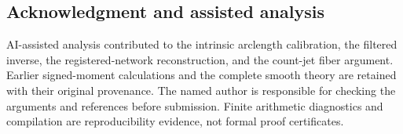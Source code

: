 \documentclass[11pt]{amsart}
\theoremstyle{definition}\newtheorem{definition}[theorem]{Definition}
\theoremstyle{remark}\newtheorem{remark}[theorem]{Remark}
\numberwithin{equation}{section}
\begin{document}
\subsection*{Acknowledgment and assisted analysis}
AI-assisted analysis contributed to the intrinsic arclength calibration,
the filtered inverse, the registered-network reconstruction, and the
count-jet fiber argument. Earlier signed-moment calculations and the
complete smooth theory are retained with their original provenance.
The named author is responsible for checking the arguments and references
before submission. Finite arithmetic diagnostics and compilation are
reproducibility evidence, not formal proof certificates.

\end{document}
